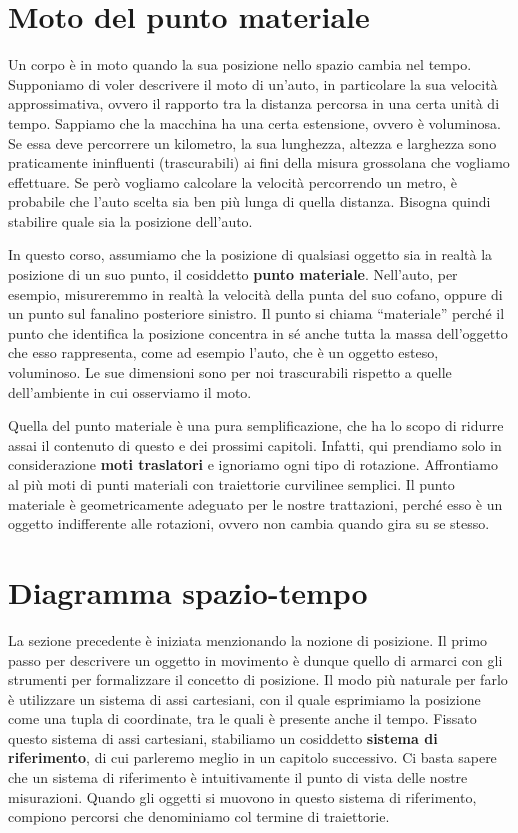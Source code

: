 \marginpar{\minitoc}

\section{Moto del punto materiale}
Un corpo è in moto quando la sua posizione nello spazio cambia nel tempo.
Supponiamo di voler descrivere il moto di un'auto, in particolare la sua
velocità approssimativa, ovvero il rapporto tra la distanza percorsa in
una certa unità di tempo.
Sappiamo che la macchina ha una certa estensione, ovvero è
voluminosa. Se essa deve percorrere un kilometro, la sua lunghezza,
altezza e larghezza sono praticamente ininfluenti (trascurabili) ai fini della misura
grossolana che vogliamo effettuare. Se però vogliamo calcolare la velocità
percorrendo un metro, è probabile che l'auto scelta sia ben più lunga
di quella distanza. Bisogna quindi stabilire quale sia la posizione
dell'auto.

In questo corso, assumiamo che la posizione di qualsiasi oggetto sia
in realtà la posizione di un suo punto, il cosiddetto \textbf{punto materiale}.
Nell'auto, per esempio, misureremmo in realtà la velocità della punta
del suo cofano, oppure di un punto sul fanalino posteriore sinistro.
Il punto si chiama ``materiale'' perché il punto che identifica la
posizione concentra in sé anche tutta la massa dell'oggetto che esso
rappresenta, come ad esempio l'auto, che è un oggetto esteso,
voluminoso. Le sue dimensioni sono per noi trascurabili rispetto
a quelle dell'ambiente in cui osserviamo il moto.

Quella del punto materiale è una pura semplificazione, che ha lo scopo
di ridurre assai il contenuto di questo e dei prossimi capitoli.
Infatti, qui prendiamo solo in considerazione \textbf{moti traslatori} e ignoriamo
ogni tipo di rotazione. Affrontiamo al più moti di punti materiali
con traiettorie curvilinee semplici. Il punto materiale è geometricamente adeguato
per le nostre trattazioni, perché esso è un oggetto indifferente alle
rotazioni, ovvero non cambia quando gira su se stesso.

\section{Diagramma spazio-tempo}
La sezione precedente è iniziata menzionando la nozione di posizione.
Il primo passo per descrivere un oggetto in movimento è dunque quello
di armarci con gli strumenti per formalizzare il concetto di posizione.
Il modo più naturale per farlo è utilizzare un sistema di assi cartesiani,
con il quale esprimiamo la posizione come una tupla di coordinate, tra
le quali è presente anche il tempo.
Fissato questo sistema di assi cartesiani, stabiliamo un cosiddetto
\textbf{sistema di riferimento}, di cui parleremo meglio in un capitolo
successivo. Ci basta sapere che un sistema di riferimento è intuitivamente
il punto di vista delle nostre misurazioni.
Quando gli oggetti si muovono in questo sistema di riferimento, compiono
percorsi che denominiamo col termine di traiettorie.

